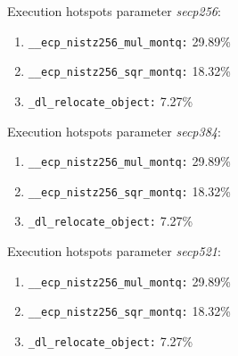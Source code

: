 Execution hotspots parameter \textit{secp256}:
\begin{enumerate}[noitemsep]
	\item \texttt{\_\_ecp\_nistz256\_mul\_montq:} 29.89\%
	\item \texttt{\_\_ecp\_nistz256\_sqr\_montq:} 18.32\%
	\item \texttt{\_dl\_relocate\_object:} 7.27\%
\end{enumerate}
Execution hotspots parameter \textit{secp384}:
\begin{enumerate}[noitemsep]
	\item \texttt{\_\_ecp\_nistz256\_mul\_montq:} 29.89\%
	\item \texttt{\_\_ecp\_nistz256\_sqr\_montq:} 18.32\%
	\item \texttt{\_dl\_relocate\_object:} 7.27\%
\end{enumerate}
Execution hotspots parameter \textit{secp521}:
\begin{enumerate}[noitemsep]
	\item \texttt{\_\_ecp\_nistz256\_mul\_montq:} 29.89\%
	\item \texttt{\_\_ecp\_nistz256\_sqr\_montq:} 18.32\%
	\item \texttt{\_dl\_relocate\_object:} 7.27\%
\end{enumerate}
